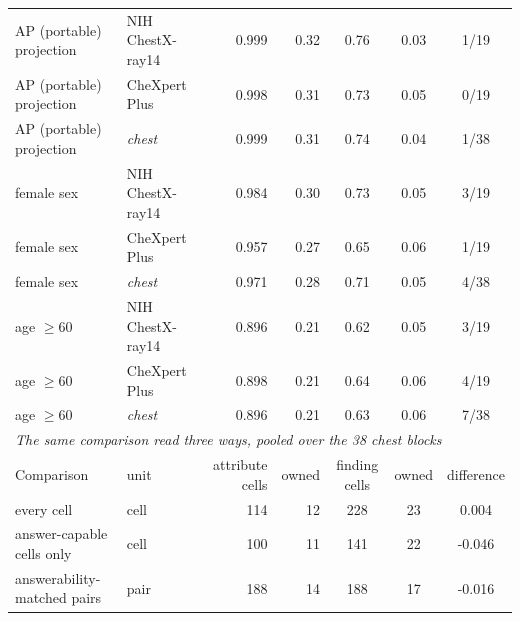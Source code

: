 \begin{table}[htbp]
\begin{tabular}{llrrccc}
\midrule
AP (portable) projection & NIH ChestX-ray14 & 0.999 & 0.32 & 0.76 & 0.03 & 1/19 \\
AP (portable) projection & CheXpert Plus & 0.998 & 0.31 & 0.73 & 0.05 & 0/19 \\
AP (portable) projection & \textit{chest} & 0.999 & 0.31 & 0.74 & 0.04 & 1/38 \\
female sex & NIH ChestX-ray14 & 0.984 & 0.30 & 0.73 & 0.05 & 3/19 \\
female sex & CheXpert Plus & 0.957 & 0.27 & 0.65 & 0.06 & 1/19 \\
female sex & \textit{chest} & 0.971 & 0.28 & 0.71 & 0.05 & 4/38 \\
age $\geq60$ & NIH ChestX-ray14 & 0.896 & 0.21 & 0.62 & 0.05 & 3/19 \\
age $\geq60$ & CheXpert Plus & 0.898 & 0.21 & 0.64 & 0.06 & 4/19 \\
age $\geq60$ & \textit{chest} & 0.896 & 0.21 & 0.63 & 0.06 & 7/38 \\
\midrule
\multicolumn{7}{l}{\textit{The same comparison read three ways, pooled over the 38 chest blocks}} \\
Comparison & unit & attribute cells & owned & finding cells & owned & difference \\
\midrule
every cell & cell & 114 & 12 & 228 & 23 & 0.004 \\
answer-capable cells only & cell & 100 & 11 & 141 & 22 & -0.046 \\
answerability-matched pairs & pair & 188 & 14 & 188 & 17 & -0.016 \\
\bottomrule
\end{tabular}
\end{table}
